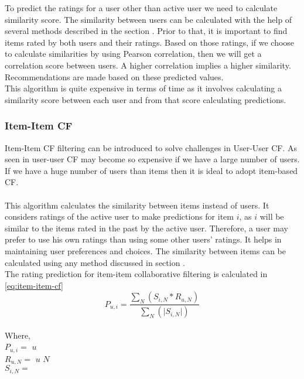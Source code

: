 \noindent To predict the ratings for a user other than active user we need to calculate similarity score. The similarity between users can be calculated with the help of several methods described in the section . Prior to that, it is important to find items rated by both users and their ratings. Based on those ratings, if we choose to calculate similarities by using Pearson correlation, then we will get a correlation score between users. A higher correlation implies a higher similarity. Recommendations are made based on these predicted values. 
\\
This algorithm is quite expensive in terms of time as it involves calculating a similarity score between each user and from that score calculating predictions. 
\\

\subsubsection{Item-Item CF}

Item-Item CF filtering can be introduced to solve challenges in User-User CF. As seen in user-user CF may become so expensive if we have a large number of users. If we have a huge number of users than items then it is ideal to adopt item-based CF.
\\
\\
This algorithm calculates the similarity between items instead of users. It considers ratings of the active user to make predictions for item $i$, as $i$ will be similar to the items rated in the past by the active user. Therefore, a user may prefer to use his own ratings than using some other users' ratings. It helps in maintaining user preferences and choices. The similarity between items can be calculated using any method discussed in section .
\\
The rating prediction for item-item collaborative filtering is calculated in \autoref{eq:item-item-cf}
\begin{equation}
P_{u,i} = \frac { \sum_N(S_{i,N} * R_{u,N})}{\sum_N (\vert S_{i,N} \vert)}
\label{eq:item-item-cf}
\end{equation}
\\
Where, 
\\
\noindent
$P_{u,i} = $  $u$ 
\\
$R_{u,N} = $  $u$  $N$ 
\\
$S_{i,N} = $ 
\\
\\


